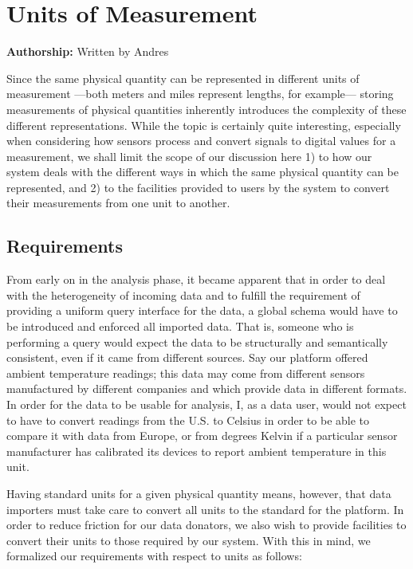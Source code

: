 \section{Units of Measurement}\label{sec:units}

\textbf{Authorship:} Written by Andres
\vspace{10 pt}

Since the same physical quantity can be represented in different units
of measurement ---both meters and miles represent lengths, for
example--- storing measurements of physical quantities inherently
introduces the complexity of these different representations. While the
topic is certainly quite interesting, especially when considering how
sensors process and convert signals to digital values for a measurement,
we shall limit the scope of our discussion here 1) to how our system
deals with the different ways in which the same physical quantity can be
represented, and 2) to the facilities provided to users by the system to
convert their measurements from one unit to another.

\subsection{Requirements}\label{requirements}

From early on in the analysis phase, it became apparent that in order to
deal with the heterogeneity of incoming data and to fulfill the
requirement of providing a uniform query interface for the data, a
global schema would have to be introduced and enforced all imported
data. That is, someone who is performing a query would expect the data
to be structurally and semantically consistent, even if it came from
different sources. Say our platform offered ambient temperature
readings; this data may come from different sensors manufactured by
different companies and which provide data in different formats. In
order for the data to be usable for analysis, I, as a data user, would
not expect to have to convert readings from the U.S. to Celsius in order
to be able to compare it with data from Europe, or from degrees Kelvin
if a particular sensor manufacturer has calibrated its devices to report
ambient temperature in this unit.

Having standard units for a given physical quantity means, however, that
data importers must take care to convert all units to the standard for
the platform. In order to reduce friction for our data donators, we also
wish to provide facilities to convert their units to those required by
our system. With this in mind, we formalized our requirements with
respect to units as follows:

